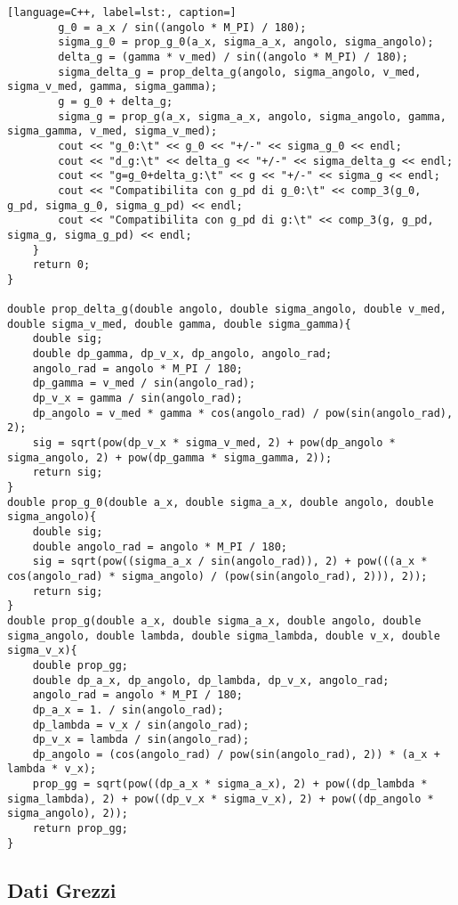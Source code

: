 \documentclass[a4paper,11pt,oneside]{article}
\begin{document}
\begin{lstlisting}[language=C++, label=lst:, caption=]
		g_0 = a_x / sin((angolo * M_PI) / 180);
		sigma_g_0 = prop_g_0(a_x, sigma_a_x, angolo, sigma_angolo);
		delta_g = (gamma * v_med) / sin((angolo * M_PI) / 180);
		sigma_delta_g = prop_delta_g(angolo, sigma_angolo, v_med, sigma_v_med, gamma, sigma_gamma);
		g = g_0 + delta_g;
		sigma_g = prop_g(a_x, sigma_a_x, angolo, sigma_angolo, gamma, sigma_gamma, v_med, sigma_v_med);
		cout << "g_0:\t" << g_0 << "+/-" << sigma_g_0 << endl;
		cout << "d_g:\t" << delta_g << "+/-" << sigma_delta_g << endl;
		cout << "g=g_0+delta_g:\t" << g << "+/-" << sigma_g << endl;
		cout << "Compatibilita con g_pd di g_0:\t" << comp_3(g_0, g_pd, sigma_g_0, sigma_g_pd) << endl;
		cout << "Compatibilita con g_pd di g:\t" << comp_3(g, g_pd, sigma_g, sigma_g_pd) << endl;
	}
	return 0;
}

double prop_delta_g(double angolo, double sigma_angolo, double v_med, double sigma_v_med, double gamma, double sigma_gamma){
	double sig;
	double dp_gamma, dp_v_x, dp_angolo, angolo_rad;
	angolo_rad = angolo * M_PI / 180;
	dp_gamma = v_med / sin(angolo_rad);
	dp_v_x = gamma / sin(angolo_rad);
	dp_angolo = v_med * gamma * cos(angolo_rad) / pow(sin(angolo_rad), 2);
	sig = sqrt(pow(dp_v_x * sigma_v_med, 2) + pow(dp_angolo * sigma_angolo, 2) + pow(dp_gamma * sigma_gamma, 2));
	return sig;
}
double prop_g_0(double a_x, double sigma_a_x, double angolo, double sigma_angolo){
	double sig;
	double angolo_rad = angolo * M_PI / 180;
	sig = sqrt(pow((sigma_a_x / sin(angolo_rad)), 2) + pow(((a_x * cos(angolo_rad) * sigma_angolo) / (pow(sin(angolo_rad), 2))), 2));
	return sig;
}
double prop_g(double a_x, double sigma_a_x, double angolo, double sigma_angolo, double lambda, double sigma_lambda, double v_x, double sigma_v_x){
	double prop_gg;
	double dp_a_x, dp_angolo, dp_lambda, dp_v_x, angolo_rad;
	angolo_rad = angolo * M_PI / 180;
	dp_a_x = 1. / sin(angolo_rad);
	dp_lambda = v_x / sin(angolo_rad);
	dp_v_x = lambda / sin(angolo_rad);
	dp_angolo = (cos(angolo_rad) / pow(sin(angolo_rad), 2)) * (a_x + lambda * v_x);
	prop_gg = sqrt(pow((dp_a_x * sigma_a_x), 2) + pow((dp_lambda * sigma_lambda), 2) + pow((dp_v_x * sigma_v_x), 2) + pow((dp_angolo * sigma_angolo), 2));
	return prop_gg;
}
\end{lstlisting}

\subsection{Dati Grezzi}
\end{document}
